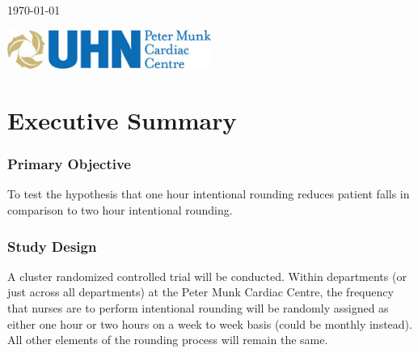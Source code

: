 \documentclass[12pt]{article}
\begin{document}
\begin{titlepage}

\begin{center}
{\large \today}
\end{center}


\newcommand*{\plogo}{\includegraphics[width=0.5\textwidth]{image001.jpg}}

\plogo\\[1cm] %
 

\vfill %
\end{titlepage}

\newpage
\tableofcontents
\newpage

\section{Executive Summary}
\subsubsection*{Primary Objective}
To test the hypothesis that one hour intentional rounding reduces patient falls in comparison to two hour intentional rounding. 
\subsubsection*{Study Design}
A cluster randomized controlled trial will be conducted. Within departments (or just across all departments) at the Peter Munk Cardiac Centre, the frequency that nurses are to perform intentional rounding will be randomly assigned as either one hour or two hours on a week to week basis (could be monthly instead). All other elements of the rounding process will remain the same.
\end{document}
